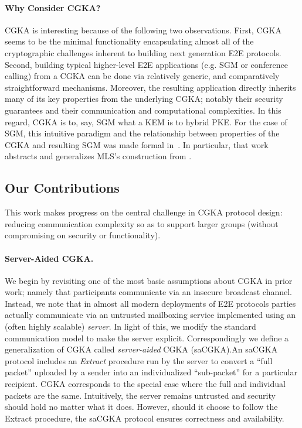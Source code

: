 \paragraph{Why Consider CGKA?}
CGKA is interesting because of the following two observations. First, CGKA
seems to be the minimal functionality encapsulating almost all of the
cryptographic challenges inherent to building next generation E2E protocols.
Second, building typical higher-level E2E applications (e.g. SGM or
conference calling) from a CGKA can be done via relatively generic, and
comparatively straightforward mechanisms. Moreover, the resulting application
directly inherits many of its key properties from the underlying CGKA;
notably their security guarantees and their communication and computational
complexities. In this regard, CGKA is to, say, SGM what a KEM is to hybrid
PKE. For the case of SGM, this intuitive paradigm and the relationship
between properties of the CGKA and resulting SGM was made formal
in~\cite{CCS:ACDT21}. In particular, that work abstracts and generalizes
MLS's construction from \protITK.

\subsection{Our Contributions}
This work makes progress on the central challenge in CGKA protocol design:
reducing communication complexity so as to support larger groups (without
compromising on security or functionality).

\paragraph{Server-Aided CGKA.}
We begin by revisiting one of the most basic assumptions about
CGKA in prior work; namely that participants communicate via an insecure
broadcast channel. Instead, we note that in almost all modern deployments of
E2E protocols parties actually communicate via an untrusted mailboxing
service implemented using an (often highly scalable) \emph{server}.
In light of this, we modify the standard communication model to make the
server explicit. Correspondingly we define a generalization of CGKA 
called \emph{server-aided} CGKA (saCGKA).An saCGKA
protocol includes an \emph{Extract} procedure run by the server to convert a
``full packet'' uploaded by a sender into an individualized ``sub-packet'' for a particular recipient.
 CGKA corresponds to
the special case where the full and individual packets are the same.
Intuitively, the server remains untrusted and security should hold no matter
what it does. However, should it choose to follow the Extract procedure, the
saCGKA protocol ensures correctness and availability.


